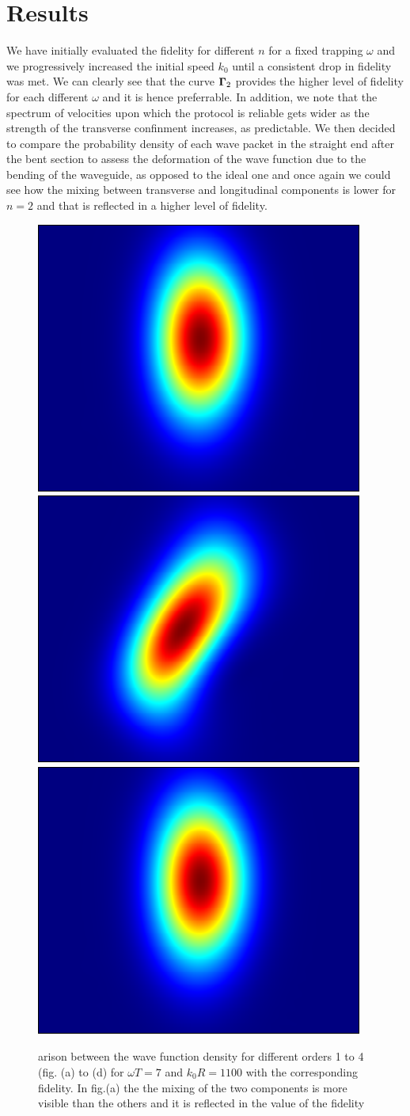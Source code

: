 \section{Results}
We have initially evaluated the fidelity for different $ n $ for a fixed trapping $ \omega $ and we progressively increased the initial speed $ k_{0} $ until a consistent drop in fidelity was met.
We can clearly see that the curve $ \mathbf{\Gamma}_{2} $ provides the higher level of fidelity for each different $ \omega $ and it is hence preferrable.
In addition, we note that the spectrum of velocities upon which the protocol is reliable gets wider as the strength of the transverse confinment increases, as predictable.
We then decided to compare the probability density of each wave packet in the straight end after the bent section to assess the deformation of the wave function due to the bending of the waveguide, as opposed to the ideal one and once again we could see how the mixing between transverse and longitudinal components is lower for $ n = 2 $ and that is reflected in a higher level of fidelity.
\begin{figure}[t!]
	\centering
	\includegraphics[width = .3\textwidth]{gfx/texdens_ord2_300_7.pdf}
	\includegraphics[width = .3\textwidth]{gfx/texdens_ord0_300_7.pdf}
	\includegraphics[width = .3\textwidth]{gfx/texdens_ord2_300_7.pdf}
	\caption{arison between the wave function density for different orders 1 to 4 (fig. (a) to (d) for $ \omega T = 7 $ and $ k_{0}R = 1100 $ with the corresponding fidelity. In fig.(a) the the mixing of the two components is more visible than the others and it is reflected in the value of the fidelity}
	\label{fig:densities}	
\end{figure}
